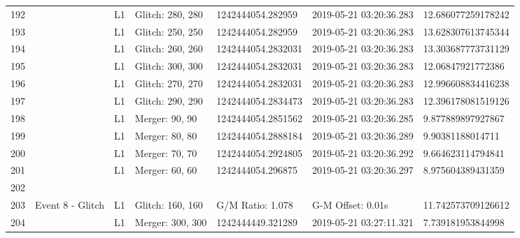 \begin{longtable}{lllllll}
192  &                                                    &       L1 &  Glitch: 280, 280 &   1242444054.282959 &  2019-05-21 03:20:36.283 &  12.686077259178242 \\
193  &                                                    &       L1 &  Glitch: 250, 250 &   1242444054.282959 &  2019-05-21 03:20:36.283 &  13.628307613745344 \\
194  &                                                    &       L1 &  Glitch: 260, 260 &  1242444054.2832031 &  2019-05-21 03:20:36.283 &  13.303687773731129 \\
195  &                                                    &       L1 &  Glitch: 300, 300 &  1242444054.2832031 &  2019-05-21 03:20:36.283 &   12.06847921772386 \\
196  &                                                    &       L1 &  Glitch: 270, 270 &  1242444054.2832031 &  2019-05-21 03:20:36.283 &  12.996608834416238 \\
197  &                                                    &       L1 &  Glitch: 290, 290 &  1242444054.2834473 &  2019-05-21 03:20:36.283 &  12.396178081519126 \\
198  &                                                    &       L1 &    Merger: 90, 90 &  1242444054.2851562 &  2019-05-21 03:20:36.285 &   9.877889897927867 \\
199  &                                                    &       L1 &    Merger: 80, 80 &  1242444054.2888184 &  2019-05-21 03:20:36.289 &    9.90381188014711 \\
200  &                                                    &       L1 &    Merger: 70, 70 &  1242444054.2924805 &  2019-05-21 03:20:36.292 &   9.664623114794841 \\
201  &                                                    &       L1 &    Merger: 60, 60 &   1242444054.296875 &  2019-05-21 03:20:36.297 &   8.975604389431359 \\
202  &                                                    &          &                   &                     &                          &                     \\
203  &                                   Event 8 - Glitch &       L1 &  Glitch: 160, 160 &    G/M Ratio: 1.078 &        G-M Offset: 0.01s &  11.742573709126612 \\
204  &                                                    &       L1 &  Merger: 300, 300 &   1242444449.321289 &  2019-05-21 03:27:11.321 &   7.739181953844998 \\

\end{longtable}
